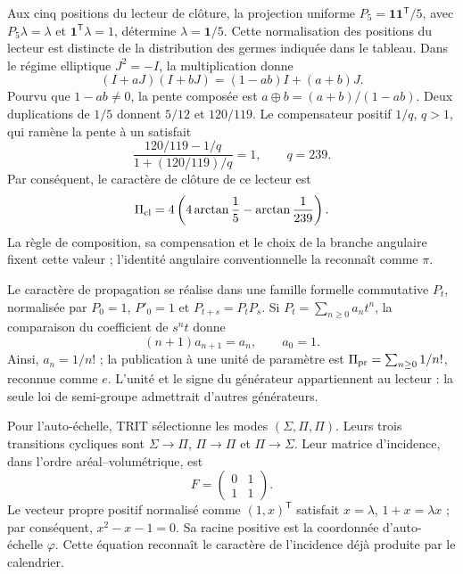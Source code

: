Aux cinq positions du lecteur de clôture, la projection uniforme
\(P_5=\mathbf1\mathbf1^{\mathsf T}/5\), avec
\(P_5\lambda=\lambda\) et \(\mathbf1^{\mathsf T}\lambda=1\), détermine
\(\lambda=\mathbf1/5\). Cette normalisation des positions du lecteur
est distincte de la distribution des germes indiquée dans le tableau.
Dans le régime elliptique \(J^2=-I\), la multiplication donne
\[
(I+aJ)(I+bJ)=(1-ab)I+(a+b)J.
\]
Pourvu que \(1-ab\ne0\), la pente composée est
\(a\oplus b=(a+b)/(1-ab)\). Deux duplications de \(1/5\) donnent
\(5/12\) et \(120/119\). Le compensateur positif \(1/q\), \(q>1\),
qui ramène la pente à un satisfait
\[
\frac{120/119-1/q}{1+(120/119)/q}=1,
\qquad q=239.
\]
Par conséquent, le caractère de clôture de ce lecteur est
\begin{equation}
 \Pi_{\rm cl}=4\left(4\arctan\frac15-\arctan\frac1{239}\right).
 \label{vi:vi:dep:lector-clausura}
\end{equation}
La règle de composition, sa compensation et le choix de la branche angulaire
fixent cette valeur ; l’identité angulaire conventionnelle la reconnaît comme \(\pi\).

Le caractère de propagation se réalise dans une famille formelle commutative
\(P_t\), normalisée par \(P_0=1\), \(P'_0=1\) et
\(P_{t+s}=P_tP_s\). Si \(P_t=\sum_{n\ge0}a_nt^n\), la comparaison
du coefficient de \(s^nt\) donne
\[
 (n+1)a_{n+1}=a_n,\qquad a_0=1.
\]
Ainsi, \(a_n=1/n!\) ; la publication à une unité de paramètre est
\(\Pi_{\rm pr}=\sum_{n\ge0}1/n!\), reconnue comme \(e\).
L'unité et le signe du générateur appartiennent au lecteur : la seule loi
de semi-groupe admettrait d'autres générateurs.

Pour l’auto-échelle, TRIT sélectionne les modes
\((\Sigma,\Pi,\Pi)\). Leurs trois transitions cycliques sont
\(\Sigma\to\Pi\), \(\Pi\to\Pi\) et \(\Pi\to\Sigma\). Leur matrice
d’incidence, dans l’ordre aréal--volumétrique, est
\begin{equation}
 F=\begin{pmatrix}0&1\\1&1\end{pmatrix}.
 \label{vi:vi:dep:incidencia-hojas}
\end{equation}
Le vecteur propre positif normalisé comme \((1,x)^{\mathsf T}\)
satisfait \(x=\lambda\), \(1+x=\lambda x\) ; par conséquent,
\(x^2-x-1=0\). Sa racine positive est la coordonnée d’auto-échelle
\(\varphi\). Cette équation reconnaît le caractère de l’incidence déjà
produite par le calendrier.

